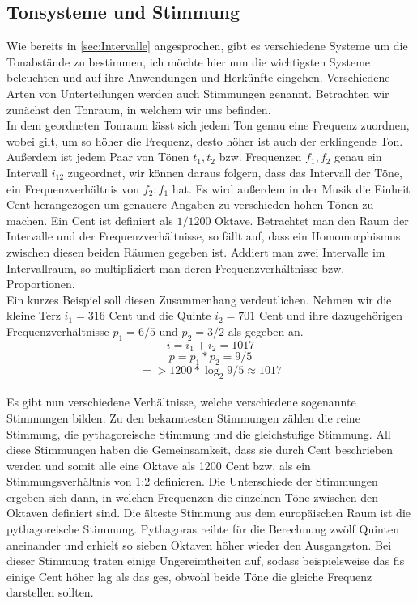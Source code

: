 \subsection*{Tonsysteme und Stimmung}
\label{sec:Tonsysteme}
Wie bereits in \ref{sec:Intervalle} angesprochen, gibt es verschiedene Systeme um die Tonabstände zu bestimmen, ich möchte hier nun die wichtigsten Systeme beleuchten und auf ihre Anwendungen und Herkünfte eingehen.
Verschiedene Arten von Unterteilungen werden auch Stimmungen genannt. Betrachten wir zunächst den Tonraum, in welchem wir uns befinden. \\
In dem geordneten Tonraum lässt sich jedem Ton genau eine Frequenz zuordnen, wobei gilt, um so höher die Frequenz, desto höher ist auch der erklingende Ton. Außerdem ist jedem Paar von Tönen $t_1, t_2$ bzw. Frequenzen $f_1, f_2$ genau ein Intervall $i_{12}$ zugeordnet, 
wir können daraus folgern, dass das Intervall der Töne, ein Frequenzverhältnis von $f_2 : f_1$ hat. Es wird außerdem in der Musik die Einheit Cent herangezogen um genauere Angaben zu verschieden hohen Tönen zu machen. Ein Cent ist definiert als 
$1/1200$ Oktave. Betrachtet man den Raum der Intervalle und der Frequenzverhältnisse, so fällt auf, dass ein Homomorphismus zwischen diesen beiden Räumen gegeben ist. Addiert man zwei Intervalle im Intervallraum, so multipliziert man deren Frequenzverhältnisse bzw. Proportionen. \\
Ein kurzes Beispiel soll diesen Zusammenhang verdeutlichen. Nehmen wir die kleine Terz $i_1 =  316$ Cent und die Quinte $i_2 =  701$ Cent und ihre dazugehörigen Frequenzverhältnisse $p_1 = 6/5$ und $p_2 = 3/2$ als gegeben an.
$$    i = i_1 + i_2 = 1017  $$
$$    p = p_1 * p_2 = 9/5   $$
$$   => 1200 * \log_2{9/5} \approx 1017     $$
\\
Es gibt nun verschiedene Verhältnisse, welche verschiedene sogenannte Stimmungen bilden. Zu den bekanntesten Stimmungen zählen die reine Stimmung, die pythagoreische Stimmung und die gleichstufige Stimmung.
All diese Stimmungen haben die Gemeinsamkeit, dass sie durch Cent beschrieben werden und somit alle eine Oktave als 1200 Cent bzw. als ein Stimmungsverhältnis von 1:2 definieren. Die Unterschiede der Stimmungen ergeben sich dann, in welchen Frequenzen die einzelnen Töne zwischen den Oktaven definiert sind. Die älteste Stimmung aus dem europäischen Raum ist die pythagoreische Stimmung. Pythagoras reihte für die Berechnung zwölf Quinten aneinander und erhielt so sieben Oktaven höher wieder den Ausgangston. Bei dieser Stimmung traten einige 
Ungereimtheiten auf, sodass beispielsweise das fis einige Cent höher lag als das ges, obwohl beide Töne die gleiche Frequenz darstellen sollten. 
